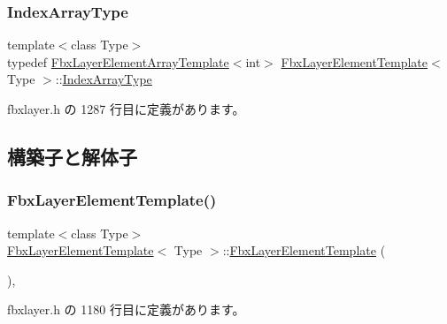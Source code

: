 \subsubsection{\texorpdfstring{Index\+Array\+Type}{IndexArrayType}}
{\footnotesize\ttfamily template$<$class Type$>$ \\
typedef \hyperlink{class_fbx_layer_element_array_template}{Fbx\+Layer\+Element\+Array\+Template}$<$int$>$ \hyperlink{class_fbx_layer_element_template}{Fbx\+Layer\+Element\+Template}$<$ Type $>$\+::\hyperlink{class_fbx_layer_element_template_ada80e444d13e2a73cb90551a712a58ed}{Index\+Array\+Type}}



 fbxlayer.\+h の 1287 行目に定義があります。



\subsection{構築子と解体子}
\mbox{\label{class_fbx_layer_element_template_a6a71830fc5470ac678678306dea4b550}} 
\subsubsection{\texorpdfstring{Fbx\+Layer\+Element\+Template()}{FbxLayerElementTemplate()}}
{\footnotesize\ttfamily template$<$class Type$>$ \\
\hyperlink{class_fbx_layer_element_template}{Fbx\+Layer\+Element\+Template}$<$ Type $>$\+::\hyperlink{class_fbx_layer_element_template}{Fbx\+Layer\+Element\+Template} (\begin{DoxyParamCaption}{ }\end{DoxyParamCaption})\hspace{0.3cm}{\ttfamily [inline]}, {\ttfamily [protected]}}



 fbxlayer.\+h の 1180 行目に定義があります。

\mbox{\label{class_fbx_layer_element_template_a3d88304159752296aece120bb005e546}} 
